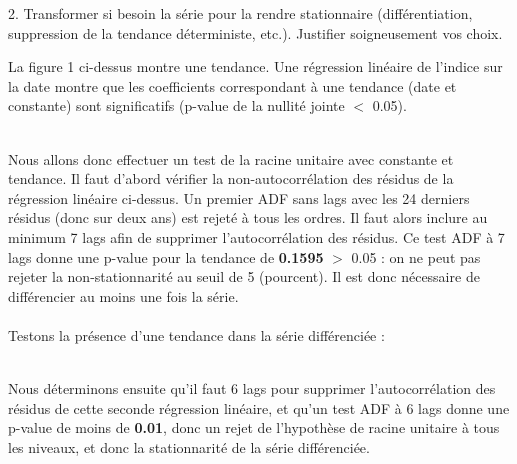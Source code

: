 \documentclass[a4paper, 12pt]{article} %
\begin{document}
\begin{tcolorbox}
{\normalsize
2. Transformer si besoin la série pour la rendre stationnaire (différentiation, suppression de la tendance
déterministe, etc.). Justifier soigneusement vos choix.}
\end{tcolorbox}
{\small
{La figure 1 ci-dessus montre une tendance. Une régression linéaire de l'indice sur la date montre que les coefficients correspondant à une tendance (date et constante) sont significatifs (p-value de la nullité jointe $<$ 0.05). }}
\begin{table}[h]
    \centering
    \caption{Régression linéaire de l'indice sur la date}
\end{table}
{\small
\\{Nous allons donc effectuer un test de la racine unitaire avec constante et tendance. Il faut d'abord vérifier la non-autocorrélation des résidus de la régression linéaire ci-dessus. Un premier ADF sans lags avec les 24 derniers résidus (donc sur deux ans) est rejeté à tous les ordres. Il faut alors inclure au minimum 7 lags afin de supprimer l'autocorrélation des résidus. \newline Ce test ADF à 7 lags donne une p-value pour la tendance de \textbf{0.1595} $>$ 0.05 : on ne peut pas rejeter la non-stationnarité au seuil de 5 (pourcent). Il est donc nécessaire de différencier au moins une fois la série.}}
\\ \\{\small
{Testons la présence d'une tendance dans la série différenciée :}}
\begin{table}[h]
    \centering
    \caption{Régression linéaire de l'indice différencié sur la date}
\end{table}
{\small
{\\Nous déterminons ensuite qu'il faut 6 lags pour supprimer l'autocorrélation des résidus de cette seconde régression linéaire, et qu'un test ADF à 6 lags donne une p-value de moins de \textbf{0.01}, donc un rejet de l'hypothèse de racine unitaire à tous les niveaux, et donc la stationnarité de la série différenciée.}}
\end{document}
